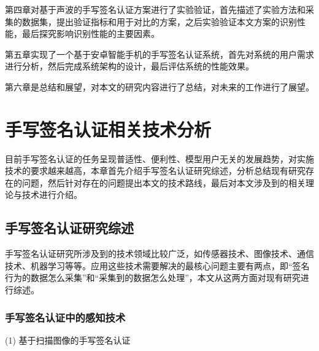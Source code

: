 第四章对基于声波的手写签名认证方案进行了实验验证，首先描述了实验方法和采集的数据集，提出验证指标和用于对比的方案，之后实验验证本文方案的识别性能，最后探究影响识别性能的主要因素。

第五章实现了一个基于安卓智能手机的手写签名认证系统，首先对系统的用户需求进行分析，然后完成系统架构的设计，最后评估系统的性能效果。

第六章是总结和展望，对本文的研究内容进行了总结，对未来的工作进行了展望。

\chapter{手写签名认证相关技术分析}
\label{chap:related-work}
目前手写签名认证的任务呈现普适性、便利性、模型用户无关的发展趋势，对实施技术的要求越来越高，本章首先介绍手写签名认证研究综述，分析总结现有研究存在的问题，然后针对存在的问题提出本文的技术路线，最后对本文涉及到的相关理论与技术进行介绍。
\section{手写签名认证研究综述}
手写签名认证研究所涉及到的技术领域比较广泛，如传感器技术、图像技术、通信技术、机器学习等等。应用这些技术需要解决的最核心问题主要有两点，即“签名行为的数据怎么采集”和“采集到的数据怎么处理”，本文从这两方面对现有研究进行综述。
\subsection{手写签名认证中的感知技术}
(1) 基于扫描图像的手写签名认证

